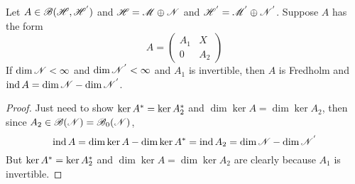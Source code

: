 \begin{lem}
	Let $A \in \mathscr{B}(\mathscr{H},\mathscr{H^{'}})$ and $\mathscr{H} = \mathscr{M} \oplus \mathscr{N}$ and $\mathscr{H}^{'} = \mathscr{M}^{'} \oplus \mathscr{N}^{'}$. Suppose $A$ has the form
	\begin{equation*}
		A = \left(
			\begin{array}{cc}
				A_1 & X \\
				0 & A_2
			\end{array}
		\right)
	\end{equation*}
	If $\dim{\mathscr{N}} < \infty$ and $\dim{\mathscr{N}^{'}} < \infty$ and $A_1$ is invertible, then $A$ is Fredholm and $\operatorname{ind}{A} = \dim{\mathscr{N}}-\dim{\mathscr{N}^{'}}$.
\end{lem}
\begin{proof}
	Just need to show $\ker{A^{*}} = \ker{A_2^{*}}$ and $\dim{\ker{A}} = \dim{\ker{A_2}}$, then since $A_2 \in \mathscr{B}(\mathscr{N})=\mathscr{B}_0(\mathscr{N})$, 
	\begin{equation*}
		\operatorname{ind}{A} = \dim{\ker{A}} - \dim{\ker{A^{*}}} = \operatorname{ind}{A_2} = \dim{\mathscr{N}}-\dim{\mathscr{N}^{'}}
	\end{equation*}
	But $\ker{A^{*}} = \ker{A_2^{*}}$ and $\dim{\ker{A}} = \dim{\ker{A_2}}$ are clearly because $A_1$ is invertible.
\end{proof}

